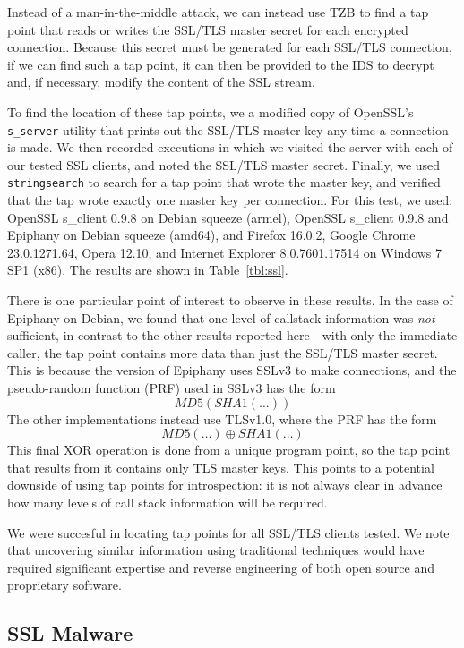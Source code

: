 Instead of a man-in-the-middle attack, we can instead use TZB to find a
tap point that reads or writes the SSL/TLS master secret for each
encrypted connection. Because this secret must be generated for each
SSL/TLS connection, if we can find such a tap point, it can then be
provided to the IDS to decrypt and, if necessary, modify the content of
the SSL stream.

To find the location of these tap points, we a modified copy of
OpenSSL's \texttt{s\_server} utility that prints out the SSL/TLS master
key any time a connection is made. We then recorded executions in which
we visited the server with each of our tested SSL clients, and noted the
SSL/TLS master secret. Finally, we used \texttt{stringsearch} to search
for a tap point that wrote the master key, and verified that the tap
wrote exactly one master key per connection. For this test, we used:
OpenSSL s\_client 0.9.8 on Debian squeeze (armel), OpenSSL s\_client
0.9.8 and Epiphany  on Debian squeeze (amd64), and Firefox
16.0.2, Google Chrome 23.0.1271.64, Opera 12.10, and Internet Explorer
8.0.7601.17514 on Windows 7 SP1 (x86). The results are shown in
Table~\ref{tbl:ssl}.

There is one particular point of interest to observe in these results.
In the case of Epiphany on Debian, we found that one level of callstack
information was \emph{not} sufficient, in contrast to the other results
reported here---with only the immediate caller, the tap point contains
more data than just the SSL/TLS master secret. This is because the
version of Epiphany uses SSLv3 to make connections, and the
pseudo-random function (PRF) used in SSLv3 has the form
\[ MD5(SHA1(\ldots))\] The other implementations instead use TLSv1.0,
where the PRF has the form \[ MD5(\ldots) \oplus SHA1(\ldots) \] This final
XOR operation is done from a unique program point, so the tap point that
results from it contains only TLS master keys. This points to a
potential downside of using tap points for introspection: it is not
always clear in advance how many levels of call stack information will
be required.

We were succesful in locating tap points for all SSL/TLS clients tested.
We note that uncovering similar information using traditional techniques
would have required significant expertise and reverse engineering of
both open source and proprietary software.

\subsection{SSL Malware}
\label{sec:eval:subsec:sslmal}

